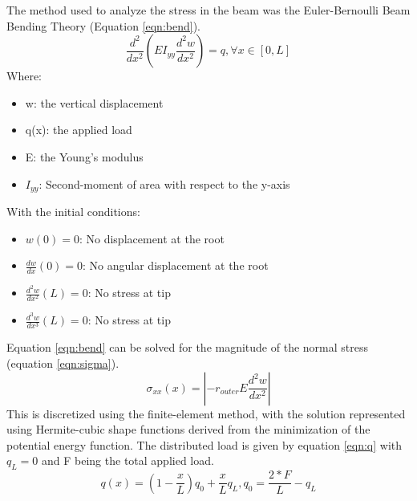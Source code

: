 \documentclass[11pt]{article}%
\begin{document}
The method used to analyze the stress in the beam was the Euler-Bernoulli Beam Bending Theory (Equation \ref{eqn:bend}).
\begin{equation}
\label{eqn:bend}
\frac{d^{2}}{dx^{2}}(EI_{yy}\frac{d^{2}w}{dx^{2}})=q, \forall x \in [0,L]
\end{equation}
Where:
\begin{itemize}
\item w: the vertical displacement
\item q(x): the applied load
\item E: the Young's modulus
\item $I_{yy}$: Second-moment of area with respect to the y-axis
\end{itemize}
With the initial conditions:
\begin{itemize}
\item $w(0)=0$: No displacement at the root
\item $\frac{dw}{dx}(0)=0$: No angular displacement at the root
\item $\frac{d^{2}w}{dx^{2}}(L)=0$: No stress at tip
\item $\frac{d^{3}w}{dx^{3}}(L)=0$: No stress at tip
\end{itemize}
Equation \ref{eqn:bend} can be solved for the magnitude of the normal stress (equation \ref{eqn:sigma}).
\begin{equation}
\label{eqn:sigma}
\sigma_{xx}(x)=|-r_{outer}E\frac{d^{2}w}{dx^{2}}|
\end{equation}
This is discretized using the finite-element method, with the solution represented using Hermite-cubic shape functions derived from the minimization of the potential energy function. The distributed load is given by equation \ref{eqn:q} with $q_{L}=0$ and F being the total applied load. 
\begin{equation}
\label{eqn:q}
q(x)=(1-\frac{x}{L})q_{0}+\frac{x}{L}q_{L}, q_{0}=\frac{2*F}{L}-q_{L}
\end{equation}
\end{document}
